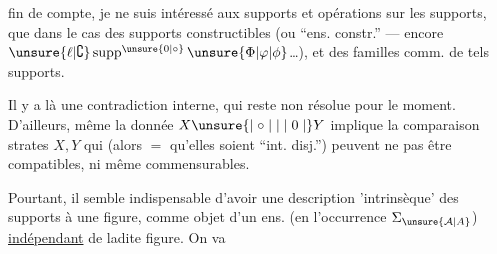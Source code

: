 
fin de compte, je ne suis intéressé aux supports et opérations sur les supports, que dans le cas des supports constructibles (ou ``ens. constr.'' ---  encore $\unsure{\ell|\complement}\operatorname{supp}^{\unsure{0|\circ}}\unsure{\Phi|\varphi|\phi}$\ldots), et des familles comm. de tels supports.

Il y a  là une contradiction interne, qui reste non résolue pour le moment. D'ailleurs, même la donnée  $X\unsure{\mid\circ\mid|\mid0\mid}Y$ implique la comparaison  strates $X,Y$ qui (alors $=$ qu'elles soient ``int. disj.'') peuvent ne pas être compatibles, ni même commensurables.

Pourtant, il semble indispensable d'avoir une description 'intrinsèque' des supports  à une figure, comme objet d'un ens. (en l'occurrence $\Sigma_{\unsure{\mathcal A|A}}$) \uline{indépendant} de ladite figure. On va 
